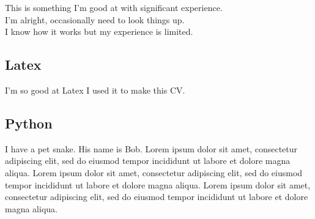 \fstar This is something I'm good at with significant experience.\\
\mstar I'm alright, occasionally need to look things up.\\
\lstar I know how it works but my experience is limited.\\
\subsection{\fstar Latex}
I'm so good at Latex I used it to make this CV.
\subsection{\mstar Python}
I have a pet snake. His name is Bob.
Lorem ipsum dolor sit amet, consectetur adipiscing elit, sed do eiusmod tempor incididunt ut labore et dolore magna aliqua. 
Lorem ipsum dolor sit amet, consectetur adipiscing elit, sed do eiusmod tempor incididunt ut labore et dolore magna aliqua. 
Lorem ipsum dolor sit amet, consectetur adipiscing elit, sed do eiusmod tempor incididunt ut labore et dolore magna aliqua. 

